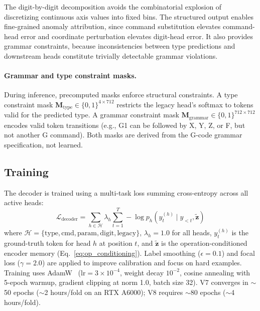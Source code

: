 The digit-by-digit decomposition avoids the combinatorial explosion of discretizing continuous axis values into fixed bins.
The structured output enables fine-grained anomaly attribution, since command substitution elevates command-head error and coordinate perturbation elevates digit-head error.
It also provides grammar constraints, because inconsistencies between type predictions and downstream heads constitute trivially detectable grammar violations.

\paragraph{Grammar and type constraint masks.}
During inference, precomputed masks enforce structural constraints.
A type constraint mask $\mathbf{M}_{\text{type}} \in \{0, 1\}^{4 \times 712}$ restricts the legacy head's softmax to tokens valid for the predicted type.
A grammar constraint mask $\mathbf{M}_{\text{grammar}} \in \{0, 1\}^{712 \times 712}$ encodes valid token transitions (e.g., G1 can be followed by X, Y, Z, or F, but not another G command).
Both masks are derived from the G-code grammar specification, not learned.

\subsection{Training}
\label{sec:training}

The decoder is trained using a multi-task loss summing cross-entropy across all active heads:
\begin{equation}
    \mathcal{L}_{\text{decoder}} = \sum_{h \in \mathcal{H}} \lambda_h \sum_{t=1}^{T} -\log p_h(y_t^{(h)} \mid y_{<t}, \tilde{\mathbf{z}})
    \label{eq:decoder_loss}
\end{equation}
where $\mathcal{H} = \{\text{type}, \text{cmd}, \text{param}, \text{digit}, \text{legacy}\}$, $\lambda_h = 1.0$ for all heads, $y_t^{(h)}$ is the ground-truth token for head $h$ at position $t$, and $\tilde{\mathbf{z}}$ is the operation-conditioned encoder memory (Eq.~\ref{eq:op_conditioning}).
Label smoothing ($\epsilon = 0.1$) and focal loss ($\gamma = 2.0$) are applied to improve calibration and focus on hard examples.
Training uses AdamW~\cite{loshchilov2019decoupled} ($\text{lr} = 3 \times 10^{-4}$, weight decay $10^{-2}$, cosine annealing with 5-epoch warmup, gradient clipping at norm 1.0, batch size 32).
V7 converges in $\sim$50 epochs ($\sim$2 hours/fold on an RTX A6000); V8 requires $\sim$80 epochs ($\sim$4 hours/fold).
